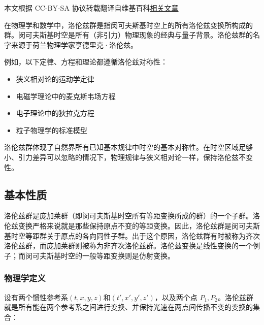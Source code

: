 
本文根据 CC-BY-SA 协议转载翻译自维基百科\href{https://en.wikipedia.org/wiki/Lorentz_group}{相关文章}

在物理学和数学中，洛伦兹群是指闵可夫斯基时空上的所有洛伦兹变换所构成的群。闵可夫斯基时空是所有（非引力）物理现象的经典与量子背景。洛伦兹群的名字来源于荷兰物理学家亨德里克·洛伦兹。

例如，以下定律、方程和理论都遵循洛伦兹对称性：
\begin{itemize}
\item 狭义相对论的运动学定律
\item 电磁学理论中的麦克斯韦场方程
\item 电子理论中的狄拉克方程
\item 粒子物理学的标准模型
\end{itemize}
洛伦兹群体现了自然界所有已知基本规律中时空的基本对称性。在时空区域足够小、引力差异可以忽略的情况下，物理规律与狭义相对论一样，保持洛伦兹不变性。
\subsection{基本性质}
洛伦兹群是庞加莱群（即闵可夫斯基时空所有等距变换所成的群）的一个子群。洛伦兹变换严格来说就是那些保持原点不变的等距变换。因此，洛伦兹群是闵可夫斯基时空等距群关于原点的各向同性子群。出于这个原因，洛伦兹群有时被称为齐次洛伦兹群，而庞加莱群则被称为非齐次洛伦兹群。洛伦兹变换是线性变换的一个例子；而闵可夫斯基时空的一般等距变换则是仿射变换。
\subsubsection{物理学定义}
设有两个惯性参考系$(t, x, y, z)$和$(t′, x′, y′, z′)$，以及两个点 $P_{1}, P_{2}$。洛伦兹群就是所有能在两个参考系之间进行变换、并保持光速在两点间传播不变的变换的集合：
